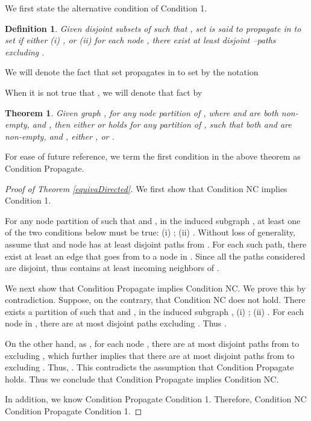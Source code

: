 \documentclass[letterpaper, 11pt]{article}
\newtheorem{definition}{Definition}[section]
\newtheorem{theorem}{Theorem}[section]
\begin{document}
We first state the alternative condition of Condition 1.
\begin{definition}
Given disjoint subsets  of  such that , set  is said to propagate in  to set  if either (i) , or (ii) for each node , there exist at least  disjoint --paths excluding .
\end{definition}

We will denote the fact that set  propagates in  to set  by the notation


When it is not true that , we will denote that fact by











\begin{theorem}
Given graph , for any node partition  of , where  and  are both non-empty, and , then either  or  holds  for any partition  of , such that both  and  are non-empty, and , either , or .
\end{theorem}

For ease of future reference, we term the first condition in the above theorem as Condition Propagate.






\begin{proof}[Proof of Theorem \ref{equivaDirected}]
We first show that Condition NC implies Condition 1.

For any node partition  of  such that  and , in the induced subgraph ,
at least one of the two conditions below must be true: (i) ; (ii) . Without loss of generality, assume that  and node  has at least  disjoint paths from . For each such path, there exist at least an edge that goes from  to a node in . Since all the paths considered are disjoint, thus  contains at least  incoming neighbors of .


We next show that Condition Propagate implies Condition NC. We prove this by contradiction. Suppose, on the contrary, that Condition NC does not hold. There exists a partition  of  such that  and , in the induced subgraph ,
 (i) ; (ii) . For each node  in , there are at most  disjoint  paths excluding . Thus .

On the other hand, as , for each node , there are at most  disjoint paths from  to  excluding , which further implies that there are at most  disjoint paths from  to  excluding .
Thus, . This contradicts the assumption that Condition Propagate holds. Thus we conclude that Condition Propagate implies Condition NC.

In addition, we know Condition Propagate  Condition 1. Therefore, Condition NC  Condition Propagate  Condition 1.
\end{proof}
\end{document}
